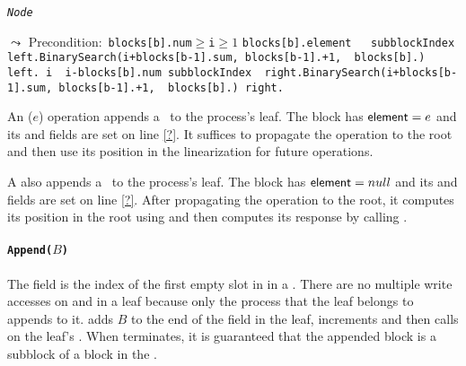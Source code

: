 \begin{algorithm}
\caption{\tt{\sl{Node}}}
\begin{algorithmic}[1]
\setcounter{ALG@line}{94}

\Statex $\leadsto$ \textsf{Precondition:~\tt{blocks[b].num$\geq$i$\geq 1$}}
 
\State\Return \tt{blocks[b].element} \label{getBaseCase}
 \label{leftOrRight} 
\State \tt{subblockIndex \assign left.BinarySearch(i+blocks[b-1].sum, blocks[b-1].\eleft+1,} \label{leftChildGet}
\Statex \hspace{10.7em}\tt{blocks[b].\eleft)} 
\State \Return\tt{left.} 
\Else
\State \tt{i \assign\ i-blocks[b].num}
\State\tt{subblockIndex \assign\ right.BinarySearch(i+blocks[b-1].sum, blocks[b-1].\eright+1,} \label{rightChildGet}
\Statex \hspace{11.1em}\tt{blocks[b].\eright)} 
\State \Return\tt{right.} 
\EndIf
{}


\end{algorithmic}
\end{algorithm}

An ($e$) operation appends a \block\ to the process's leaf.
The block has $\mbox{\sf element}=e$ and its  and  fields are set
on line \ref{?}.
It suffices to propagate the operation to the root and
then use its position in the linearization for future 
operations.

A  also appends a \block\ to the process's leaf.
The block has $\mbox{\sf element}=null$ and its  and  fields are set
on line \ref{?}.
After propagating the operation to the root, it computes
its position in the root using
 and then computes its response by calling . 

\paragraph{\tt{Append($B$)}}
The  field is the index of the first empty slot in
 in a . There are no multiple write accesses
on  and  in a leaf because only the process that
the leaf belongs to appends to it.  adds $B$ to the
end of the  field in the leaf, increments  and
then calls  on the leaf's . When
 terminates, it is guaranteed that the appended block is
a subblock of a block in the .  

